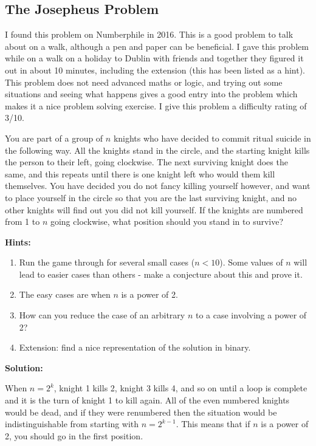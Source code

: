 \subsection{The Josepheus Problem}

I found this problem on Numberphile in 2016. This is a good problem to talk about on a walk, although a pen and paper can be beneficial. I gave this problem while on a walk on a holiday to Dublin with friends and together they figured it out in about 10 minutes, including the extension (this has been listed as a hint). This problem does not need advanced maths or logic, and trying out some situations and seeing what happens gives a good entry into the problem which makes it a nice problem solving exercise. I give this problem a difficulty rating of 3/10.

You are part of a group of $n$ knights who have decided to commit ritual suicide in the following way. All the knights stand in the circle, and the starting knight kills the person to their left, going clockwise. The next surviving knight does the same, and this repeats until there is one knight left who would them kill themselves. You have decided you do not fancy killing yourself however, and want to place yourself in the circle so that you are the last surviving knight, and no other knights will find out you did not kill yourself. If the knights are numbered from 1 to $n$ going clockwise, what position should you stand in to survive?

\textbf{Hints:}

\begin{enumerate}
	\item Run the game through for several small cases ($n < 10$). Some values of $n$ will lead to easier cases than others - make a conjecture about this and prove it.
	\item The easy cases are when $n$ is a power of 2.
	\item How can you reduce the case of an arbitrary $n$ to a case involving a power of 2?
	\item Extension: find a nice representation of the solution in binary.
\end{enumerate}

\textbf{Solution:}

When $n = 2^k$, knight 1 kills 2, knight 3 kills 4, and so on until a loop is complete and it is the turn of knight 1 to kill again. All of the even numbered knights would be dead, and if they were renumbered then the situation would be indistinguishable from starting with $n = 2^{k - 1}$. This means that if $n$ is a power of 2, you should go in the first position.

